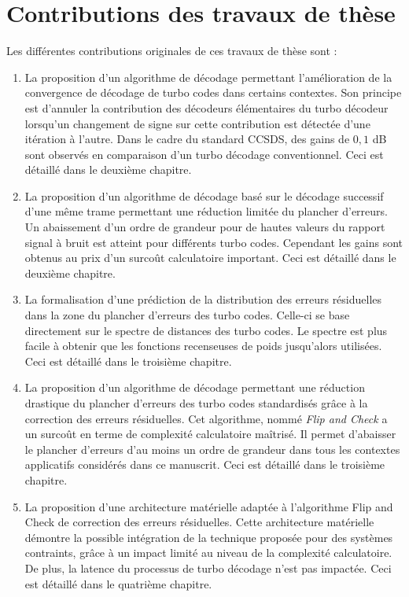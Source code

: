 \section*{Contributions des travaux de thèse}
Les différentes contributions originales de ces travaux de thèse sont : 
\begin{enumerate}
	\item La proposition d'un algorithme de décodage permettant l'amélioration de la convergence de décodage de 
	turbo codes dans certains contextes. Son principe est d'annuler la contribution des décodeurs élémentaires du 
	turbo décodeur lorsqu'un changement de signe sur cette contribution est détectée d'une itération à l'autre. Dans le
	cadre du standard CCSDS, des gains de $0,1$ dB sont observés en comparaison d'un turbo décodage conventionnel.
	Ceci est détaillé dans le deuxième chapitre.
	\item La proposition d'un algorithme de décodage basé sur le décodage successif d'une même trame permettant une 
	réduction limitée du plancher d'erreurs. Un abaissement d'un ordre de grandeur pour de hautes valeurs du rapport signal à bruit est atteint pour différents turbo codes. Cependant les gains sont obtenus au prix d'un surcoût calculatoire important. Ceci est détaillé dans le deuxième chapitre.
	\item La formalisation d'une prédiction de la distribution des erreurs résiduelles dans la zone du plancher 
	d'erreurs des turbo codes. Celle-ci se base directement sur le spectre de distances des turbo codes. Le spectre est
	plus 
	facile à obtenir que les fonctions recenseuses de poids jusqu'alors utilisées. Ceci est détaillé dans le troisième chapitre.
	\item La proposition d'un algorithme de décodage permettant une réduction drastique du plancher d'erreurs des 
	turbo codes standardisés grâce à la correction des erreurs résiduelles. Cet algorithme, nommé \textit{Flip and Check} a un surcoût en 
	terme de complexité calculatoire maîtrisé. Il permet d'abaisser le plancher d'erreurs d'au moins un ordre de grandeur 
	dans tous les contextes applicatifs considérés dans ce manuscrit. Ceci est détaillé dans le troisième chapitre.
	\item La proposition d'une architecture matérielle adaptée à l'algorithme Flip and Check de correction des erreurs résiduelles.
	Cette architecture matérielle démontre la possible intégration de la technique proposée pour des systèmes contraints, 
	grâce à un impact limité au niveau de la complexité calculatoire. De plus, la latence du 
	processus de turbo décodage n'est pas impactée. Ceci est détaillé dans le quatrième chapitre.\\
\end{enumerate}
